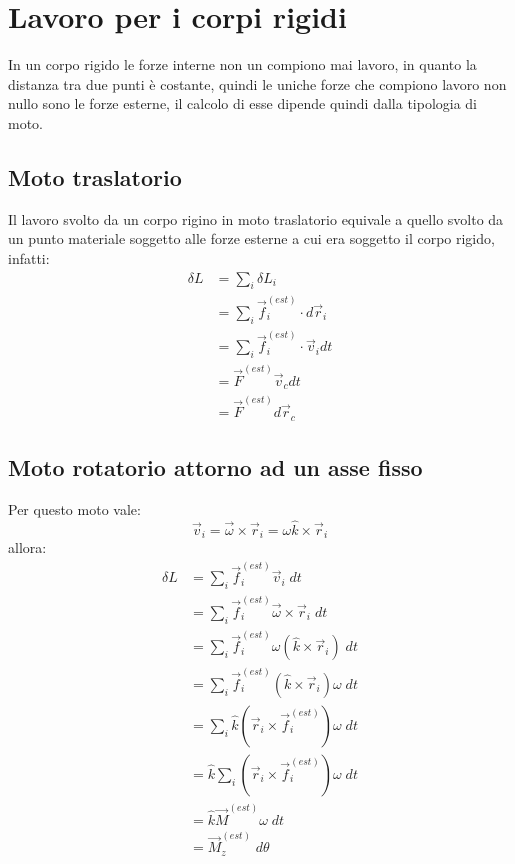 \documentclass[11pt, a4paper, openright]{book}
\theoremstyle{plain}
\theoremstyle{definition}
\begin{document}
\newpage

\section{Lavoro per i corpi rigidi}
In un corpo rigido le forze interne non un compiono mai lavoro, in quanto la distanza tra due punti è costante, quindi le uniche forze che compiono lavoro non nullo sono le forze esterne, il calcolo di esse dipende quindi dalla tipologia di moto.

\subsection{Moto traslatorio}
Il lavoro svolto da un corpo rigino in moto traslatorio equivale a quello svolto da un punto materiale soggetto alle forze esterne a cui era soggetto il corpo rigido, infatti:
\begin{align}
    \delta L & = \sum_i \delta L_i \\
             & = \sum_i \vec{f}_i^{(est)} \cdot d\vec{r}_i \\
             & = \sum_i \vec{f}_i^{(est)} \cdot \vec{v}_i dt \\
             & = \vec{F}^{(est)} \vec{v}_c dt \\
             & = \vec{F}^{(est)} d\vec{r}_c
\end{align}

\subsection{Moto rotatorio attorno ad un asse fisso}
Per questo moto vale:
\begin{equation}
    \vec{v}_i = \vec{\omega} \times \vec{r}_i = \omega \hat{k} \times \vec{r}_i
\end{equation}
allora:
\begin{align}
    \delta L & = \sum_i \vec{f}_i^{(est)} \vec{v}_i \; dt \\
             & = \sum_i \vec{f}_i^{(est)} \vec{\omega} \times \vec{r}_i \; dt \\
             & = \sum_i \vec{f}_i^{(est)} \omega (\hat{k} \times \vec{r}_i) \; dt \\
             & = \sum_i \vec{f}_i^{(est)} (\hat{k} \times \vec{r}_i) \omega \; dt \\
             & = \sum_i \hat{k} (\vec{r}_i \times \vec{f}_i^{(est)}) \omega \; dt \\
             & = \hat{k} \sum_i (\vec{r}_i \times \vec{f}_i^{(est)}) \omega \; dt \\
             & = \hat{k}\vec{M}^{(est)} \omega \; dt \\
             & = \vec{M}_z^{(est)} \; d\theta 
\end{align}
\end{document}
